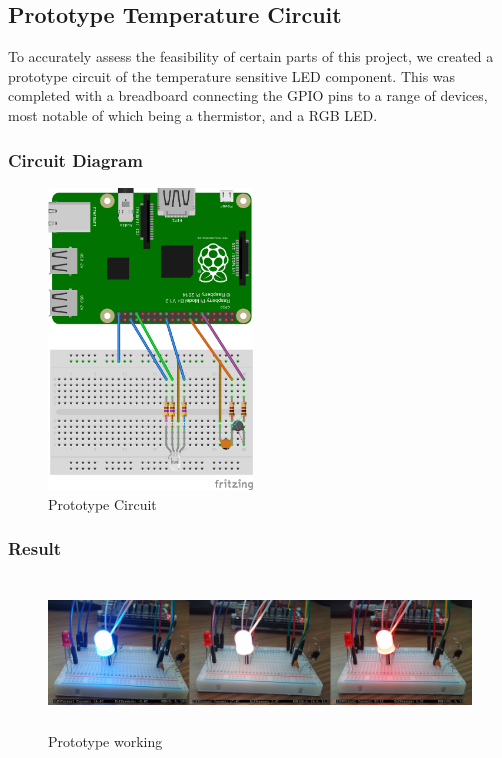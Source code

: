\documentclass[10pt]{article}
\begin{document}
\newpage
\subsection{Prototype Temperature Circuit}
To accurately assess the feasibility of certain parts of this project, we created a prototype circuit of the temperature sensitive LED component. This was completed with a breadboard connecting the GPIO pins to a range of devices, most notable of which being a thermistor, and a RGB LED.

\subsubsection{Circuit Diagram}
\begin{figure}[h]
\centering
\caption{Prototype Circuit}
\label{Prototype Circuit}
\includegraphics[height=8cm]{images/prototypeDiagram.png}
\end{figure}

\subsubsection{Result}
\begin{figure}[h]
\centering
\caption{Prototype working}
\label{Prototype working}
\includegraphics[height=4cm]{images/tempsenproto.png}
\end{figure}
\end{document}
